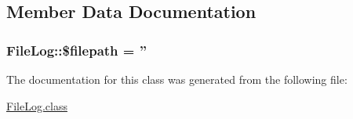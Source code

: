 \subsection{Member Data Documentation}
\hypertarget{classFileLog_a328e146bf8c4173c7cbbee8110851e24}{
\subsubsection[{\$filepath}]{\setlength{\rightskip}{0pt plus 5cm}File\-Log\-::\$filepath = ''\hspace{0.3cm}{\ttfamily [private]}}}\label{classFileLog_a328e146bf8c4173c7cbbee8110851e24}


The documentation for this class was generated from the following file\-:\begin{DoxyCompactItemize}
\item 
\hyperlink{FileLog_8class}{File\-Log.\-class}\end{DoxyCompactItemize}
